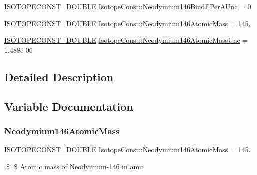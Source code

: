 \begin{DoxyCompactItemize}
\mbox{\hyperlink{group___isotope_const-_macros_ga8f45a7272ce02c0b4c65c44636ed719a}{I\+S\+O\+T\+O\+P\+E\+C\+O\+N\+S\+T\+\_\+\+D\+O\+U\+B\+LE}} \mbox{\hyperlink{group___isotope_const-_neodymium-_nd146_gae3292107743689ba0674ab5f52f812b7}{Isotope\+Const\+::\+Neodymium146\+Bind\+E\+Per\+A\+Unc}} = 0.
\item 
\mbox{\hyperlink{group___isotope_const-_macros_ga8f45a7272ce02c0b4c65c44636ed719a}{I\+S\+O\+T\+O\+P\+E\+C\+O\+N\+S\+T\+\_\+\+D\+O\+U\+B\+LE}} \mbox{\hyperlink{group___isotope_const-_neodymium-_nd146_gaf225c2a2a33688f367102e0759550125}{Isotope\+Const\+::\+Neodymium146\+Atomic\+Mass}} = 145.
\item 
\mbox{\hyperlink{group___isotope_const-_macros_ga8f45a7272ce02c0b4c65c44636ed719a}{I\+S\+O\+T\+O\+P\+E\+C\+O\+N\+S\+T\+\_\+\+D\+O\+U\+B\+LE}} \mbox{\hyperlink{group___isotope_const-_neodymium-_nd146_ga69975133a1cbfa566a047778d8c457d7}{Isotope\+Const\+::\+Neodymium146\+Atomic\+Mass\+Unc}} = 1.\+488e-\/06
\end{DoxyCompactItemize}


\subsection{Detailed Description}


\subsection{Variable Documentation}
\mbox{\label{group___isotope_const-_neodymium-_nd146_gaf225c2a2a33688f367102e0759550125}} 
\subsubsection{\texorpdfstring{Neodymium146\+Atomic\+Mass}{Neodymium146AtomicMass}}
{\footnotesize\ttfamily \mbox{\hyperlink{group___isotope_const-_macros_ga8f45a7272ce02c0b4c65c44636ed719a}{I\+S\+O\+T\+O\+P\+E\+C\+O\+N\+S\+T\+\_\+\+D\+O\+U\+B\+LE}} Isotope\+Const\+::\+Neodymium146\+Atomic\+Mass = 145.}

\$ \$ Atomic mass of Neodymium-\/146 in amu. \mbox{\label{group___isotope_const-_neodymium-_nd146_ga69975133a1cbfa566a047778d8c457d7}} 
